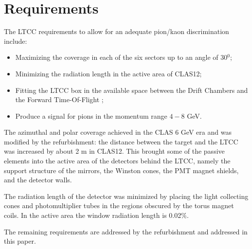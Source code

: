 \section{Requirements}


The LTCC requirements to allow for an adequate pion/kaon discrimination include:


\begin{itemize}
	\item Maximizing the coverage in each of the six sectors up to an angle of 30$^0$;
	\item Minimizing the radiation length in the active area of CLAS12;
	\item Fitting the LTCC box in the available space between the Drift Chambers \cite{dc2019} and the Forward Time-Of-Flight \cite{ftof2019};
	\item Produce a signal for pions in the momentum range $4-8$ GeV.
\end{itemize}

The azimuthal and polar coverage achieved in the CLAS 6 GeV era and was modified by the refurbishment:
the distance between the target and the LTCC was increased by about 2 m in CLAS12. This brought some of the passive
elements into the active area of the detectors behind the LTCC, namely the support structure of the mirrors, the Winston
cones, the PMT magnet shields, and the detector walls.

The radiation length of the detector was minimized by placing the light collecting cones and photomultiplier tubes
in the regions obscured by the torus magnet coils. In the active area the window radiation length is 0.02$\%$.

The remaining requirements are addressed by the refurbishment and addressed in this paper.
